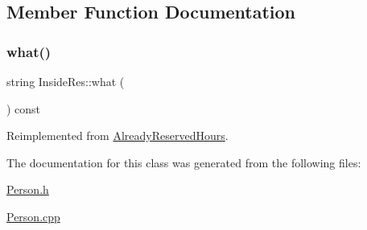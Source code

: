 \subsection{Member Function Documentation}
\mbox{\label{class_inside_res_af8e96688976739ec91630a369d4b94e7}} 
\subsubsection{\texorpdfstring{what()}{what()}}
{\footnotesize\ttfamily string Inside\+Res\+::what (\begin{DoxyParamCaption}{ }\end{DoxyParamCaption}) const\hspace{0.3cm}{\ttfamily [virtual]}}



Reimplemented from \mbox{\hyperlink{class_already_reserved_hours_a69081ef7e75aa68b9aa5c75d02fe2194}{Already\+Reserved\+Hours}}.



The documentation for this class was generated from the following files\+:\begin{DoxyCompactItemize}
\item 
\mbox{\hyperlink{_person_8h}{Person.\+h}}\item 
\mbox{\hyperlink{_person_8cpp}{Person.\+cpp}}\end{DoxyCompactItemize}

